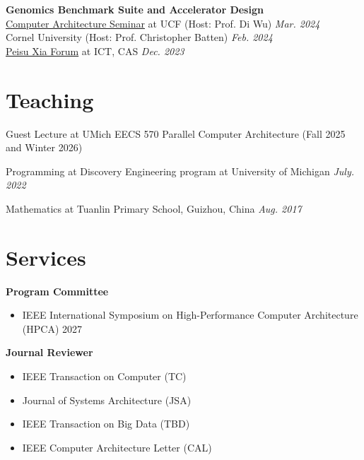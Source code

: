 \documentclass[10pt,a4paper,palatine]{moderncv}        %
\begin{document}
\begin{samepage}
\textbf{Genomics Benchmark Suite and Accelerator Design} \\
\href{https://www.youtube.com/watch?v=8ZF-ocbuwsI}{Computer Architecture Seminar} at UCF (Host: Prof. Di Wu) \hfill {\itshape Mar. 2024} \\
Cornel University (Host: Prof. Christopher Batten) \hfill {\itshape Feb. 2024} \\
\href{http://www.ict.ac.cn/xwgg/tzgg/202311/t20231129_6938791.html}{Peisu Xia Forum} at ICT, CAS \hfill {\itshape Dec. 2023} \\
\par
\end{samepage}
\vspace{-6mm}


\section{Teaching}

Guest Lecture at UMich EECS 570 Parallel Computer Architecture (Fall 2025 and Winter 2026)
\vspace{-2mm}

Programming at Discovery Engineering program at University of Michigan \hfill {\itshape July. 2022}
\vspace{-2mm}

Mathematics at Tuanlin Primary School, Guizhou, China \hfill {\itshape Aug. 2017}
\vspace{-2mm}

\section{Services}

\textbf{Program Committee}
\begin{itemize}
    \item IEEE International Symposium on High-Performance Computer Architecture (HPCA) 2027
\end{itemize}
\vspace{-2mm}

\textbf{Journal Reviewer}
\begin{itemize}
    \item IEEE Transaction on Computer (TC)
    \item Journal of Systems Architecture (JSA)
    \item IEEE Transaction on Big Data (TBD)
    \item IEEE Computer Architecture Letter (CAL)
\end{itemize}
\vspace{-2mm}
\end{document}
